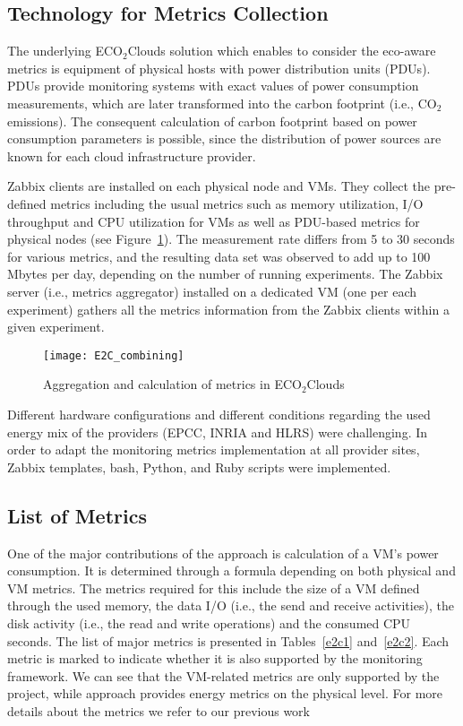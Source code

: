 \documentclass[10pt,letterpaper]{IEEEtran}
\begin{document}
\subsection{\ECO Technology for Metrics Collection}

The underlying ECO$_2$Clouds solution which enables to consider the eco-aware metrics
is equipment of physical hosts with power distribution units (PDUs).
PDUs provide monitoring systems with exact values of power consumption measurements,
which are later transformed into the carbon footprint (i.e., $\mathrm{CO_2}$ emissions).
The consequent calculation of carbon footprint based on power consumption parameters is possible, since
the distribution of power sources are known for each cloud infrastructure provider.

Zabbix clients are installed on each physical node and VMs. They collect the pre-defined metrics
including the usual metrics such as memory utilization, I/O throughput and CPU utilization for VMs
as well as PDU-based metrics for physical nodes (see Figure~\ref{fig:E2C_combining}).
The measurement rate differs from 5 to 30 seconds for various metrics, and
the resulting data set was observed to add up to 100 Mbytes per day, depending on the number of running experiments.
The Zabbix server (i.e., metrics aggregator) installed on a dedicated VM (one per each experiment) gathers all
the metrics information from the Zabbix clients within a given experiment.

\begin{figure}
  \begin{center}
    \texttt{[image: E2C\_combining]}
    \caption{Aggregation and calculation of metrics in ECO$_2$Clouds \cite{TenschertSG14}}
    \label{fig:E2C_combining}
  \end{center}
\end{figure}

Different hardware configurations and different conditions regarding the used energy
mix of the providers (EPCC, INRIA and HLRS) were challenging.
In order to adapt the monitoring metrics implementation at all provider sites,
Zabbix templates, bash, Python, and Ruby scripts were implemented. 

\subsection{List of \ECO Metrics}

One of the major contributions of the \ECO approach is calculation of a VM's power consumption.
It is determined through a formula depending on both physical and VM metrics. The metrics required 
for this include the size of a VM defined through the used memory, the data I/O (i.e., the send and receive activities), the disk activity
(i.e., the read and write operations) and the consumed CPU seconds.
The list of major \ECO metrics is presented in Tables~\ref{e2c1} and~\ref{e2c2}. Each metric is marked to
indicate whether it is also supported by the \EXCESS monitoring framework.
We can see that the VM-related metrics are only supported by the \ECO project,
while \EXCESS approach provides energy metrics on the physical level.
For more details about the \ECO metrics we refer to our previous work~\cite{Wajid2015}
\end{document}
